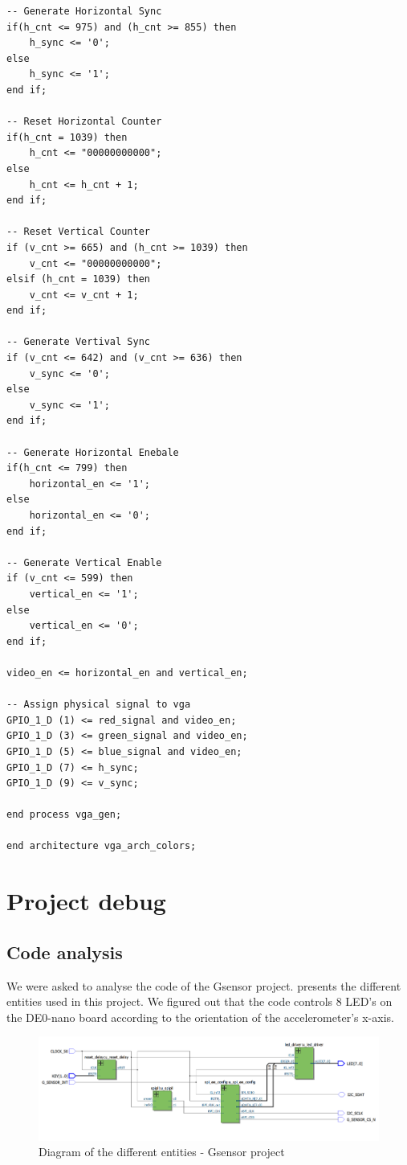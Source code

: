 \documentclass[12pt,a4paper,hyperlinks]{rapport_unif}
\begin{document}
\begin{lstlisting}
-- Generate Horizontal Sync
if(h_cnt <= 975) and (h_cnt >= 855) then
	h_sync <= '0';
else
	h_sync <= '1';
end if;

-- Reset Horizontal Counter
if(h_cnt = 1039) then
	h_cnt <= "00000000000";
else
	h_cnt <= h_cnt + 1;
end if;

-- Reset Vertical Counter
if (v_cnt >= 665) and (h_cnt >= 1039) then
	v_cnt <= "00000000000";
elsif (h_cnt = 1039) then
	v_cnt <= v_cnt + 1;
end if;

-- Generate Vertival Sync
if (v_cnt <= 642) and (v_cnt >= 636) then
	v_sync <= '0';
else
	v_sync <= '1';
end if;

-- Generate Horizontal Enebale
if(h_cnt <= 799) then
	horizontal_en <= '1';
else
	horizontal_en <= '0';
end if;

-- Generate Vertical Enable
if (v_cnt <= 599) then
	vertical_en <= '1';
else
	vertical_en <= '0';
end if;

video_en <= horizontal_en and vertical_en;

-- Assign physical signal to vga
GPIO_1_D (1) <= red_signal and video_en;
GPIO_1_D (3) <= green_signal and video_en;
GPIO_1_D (5) <= blue_signal and video_en;
GPIO_1_D (7) <= h_sync;
GPIO_1_D (9) <= v_sync;

end process vga_gen;

end architecture vga_arch_colors;
\end{lstlisting}
\section{Project debug}
\subsection{Code analysis}
We were asked to analyse the code of the Gsensor project.
 presents the different entities used in this project. We figured out that the code controls 8 LED's on the DE0-nano board according to the orientation of the accelerometer's x-axis.

\begin{figure}[htp]
 \centering
 \includegraphics[width = \textwidth]{figures/diagram}
 \caption{Diagram of the different entities - Gsensor project}
 \label{fig:diagram}
\end{figure}
\end{document}
